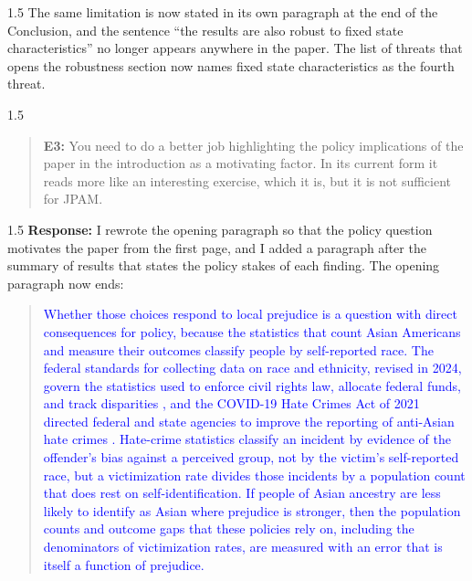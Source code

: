 \documentclass[12pt,english]{article}
\newcommand{\rrxspc}{1.5}
\begin{document}
\begin{refsection}
\begin{spacing}{\rrxspc}
        The same limitation is now stated in its own paragraph at the end of the Conclusion, and the sentence ``the results are also robust to fixed state characteristics'' no longer appears anywhere in the paper. The list of threats that opens the robustness section now names fixed state characteristics as the fourth threat.
    \end{spacing}

    \begin{spacing}{\rrxspc}
            \begin{quotation}
                \textbf{E3: } You need to do a better job highlighting the policy implications of the paper in the introduction as a motivating factor. In its current form it reads more like an interesting exercise, which it is, but it is not sufficient for JPAM.
            \end{quotation}
        \end{spacing}
        \begin{spacing}{\rrxspc}
        \textbf{Response:} I rewrote the opening paragraph so that the policy question motivates the paper from the first page, and I added a paragraph after the summary of results that states the policy stakes of each finding. The opening paragraph now ends:
        \begin{quote}\textcolor{blue}{Whether those choices respond to local prejudice is a question with direct consequences for policy, because the statistics that count Asian Americans and measure their outcomes classify people by self-reported race. The federal standards for collecting data on race and ethnicity, revised in 2024, govern the statistics used to enforce civil rights law, allocate federal funds, and track disparities \autocite{ombRevisionsStatisticalPolicy2024}, and the COVID-19 Hate Crimes Act of 2021 directed federal and state agencies to improve the reporting of anti-Asian hate crimes \autocite{covid19HateCrimesAct2021}. Hate-crime statistics classify an incident by evidence of the offender's bias against a perceived group, not by the victim's self-reported race, but a victimization rate divides those incidents by a population count that does rest on self-identification. If people of Asian ancestry are less likely to identify as Asian where prejudice is stronger, then the population counts and outcome gaps that these policies rely on, including the denominators of victimization rates, are measured with an error that is itself a function of prejudice.}\end{quote}

\end{spacing}
\end{refsection}
\end{document}
